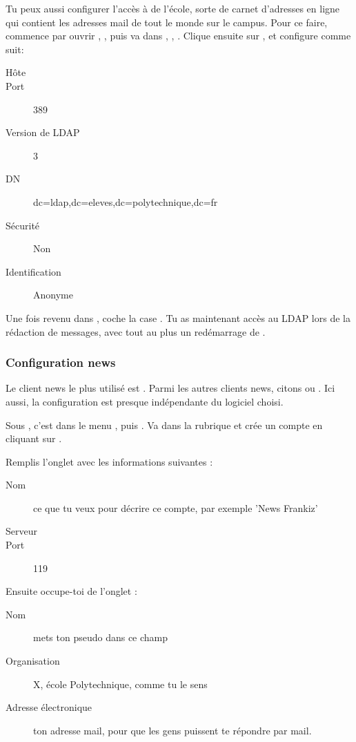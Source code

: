 \par Tu peux aussi configurer l'acc\`es \`a  de l'\'ecole, sorte de carnet d'adresses en ligne qui contient les adresses mail de tout le monde sur le campus. Pour ce faire, commence par ouvrir , , puis va dans , , . Clique ensuite sur , et configure comme suit:
\begin{description}
  \item[H\^ote] 
  \item[Port] 389
  \item[Version de LDAP] 3
  \item[DN] dc=ldap,dc=eleves,dc=polytechnique,dc=fr
  \item[S\'ecurit\'e] Non
  \item[Identification] Anonyme
\end{description}
Une fois revenu dans , coche la case . Tu as maintenant acc\`es au LDAP lors de la
r\'edaction de messages, avec tout au plus un red\'emarrage de . 

\subsubsection{Configuration news}
 Le client news le plus
utilis\'e est . Parmi les autres clients news, citons
 ou . Ici aussi, la configuration est
presque ind\'ependante du logiciel choisi.

Sous , c'est dans le menu , puis . Va dans la rubrique  et
cr\'ee un compte en cliquant sur .


Remplis l'onglet  avec les informations suivantes :
\begin{description}
  \item[Nom] ce que tu veux pour d\'ecrire ce compte, par exemple 'News Frankiz'
  \item[Serveur] 
  \item[Port] 119
\end{description}
Ensuite occupe-toi de l'onglet  :
\begin{description}
  \item[Nom] mets ton pseudo dans ce champ
  \item[Organisation] X, \'ecole Polytechnique, comme tu le sens
  \item[Adresse \'electronique] ton adresse mail, pour que les gens puissent te r\'epondre par mail.
\end{description}


